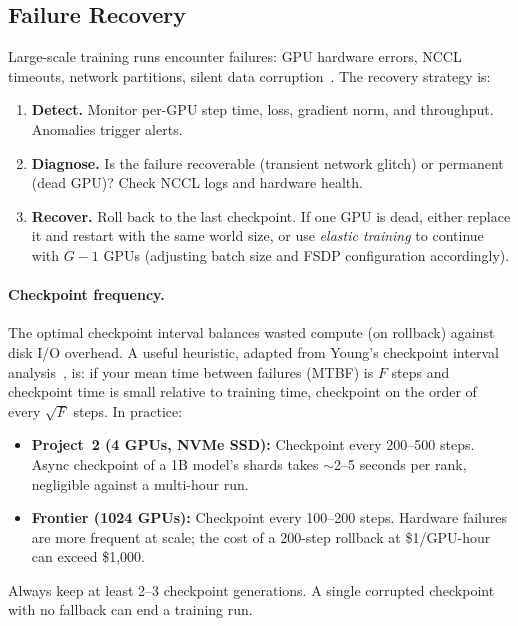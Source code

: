 \subsection{Failure Recovery}

Large-scale training runs encounter failures: GPU hardware errors, NCCL timeouts, network partitions, silent data corruption~\cite{dixit2021silent}. The recovery strategy is:

\begin{enumerate}[nosep]
  \item \textbf{Detect.} Monitor per-GPU step time, loss, gradient norm, and throughput. Anomalies trigger alerts.
  \item \textbf{Diagnose.} Is the failure recoverable (transient network glitch) or permanent (dead GPU)? Check NCCL logs and hardware health.
  \item \textbf{Recover.} Roll back to the last checkpoint. If one GPU is dead, either replace it and restart with the same world size, or use \emph{elastic training} to continue with $G-1$ GPUs (adjusting batch size and FSDP configuration accordingly).
\end{enumerate}

\paragraph{Checkpoint frequency.} The optimal checkpoint interval balances wasted compute (on rollback) against disk I/O overhead. A useful heuristic, adapted from Young's checkpoint interval analysis~\cite{young1974first}, is: if your mean time between failures (MTBF) is $F$ steps and checkpoint time is small relative to training time, checkpoint on the order of every $\sqrt{F}$ steps. In practice:

\begin{itemize}[nosep]
  \item \textbf{Project~2 (4 GPUs, NVMe SSD):} Checkpoint every 200--500 steps. Async checkpoint of a 1B model's shards takes $\sim$2--5 seconds per rank, negligible against a multi-hour run.
  \item \textbf{Frontier (1024 GPUs):} Checkpoint every 100--200 steps. Hardware failures are more frequent at scale; the cost of a 200-step rollback at \$1/GPU-hour can exceed \$1,000.
\end{itemize}

\noindent Always keep at least 2--3 checkpoint generations. A single corrupted checkpoint with no fallback can end a training run.

